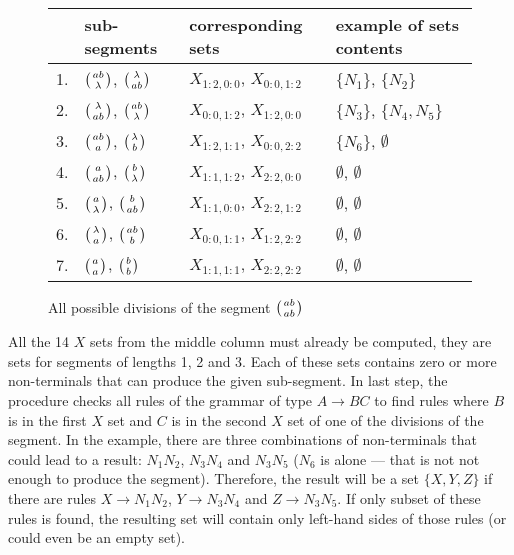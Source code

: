 \begin{figure}[H]
  \caption{All possible divisions of the segment $\wkpair{ab}{ab}$}
  \centering
  \label{tab:segment_divisions}
\begin{tabular}{ |l|l|l|l|  }
  \hline
   & sub-segments & corresponding sets  & example of sets contents \\
  \hline
  1. & $\wkpair{ab}{\lambda}$, $\wkpair{\lambda}{ab}$ & $X_{1:2,0:0}$, $X_{0:0,1:2}$ & $\{N_1\}$, $\{N_2\}$ \\ [1ex]
  2. & $\wkpair{\lambda}{ab}$, $\wkpair{ab}{\lambda}$ & $X_{0:0,1:2}$, $X_{1:2,0:0}$ & $\{N_3\}$, $\{N_4, N_5\}$ \\ [1ex]
  3. & $\wkpair{ab}{a}$, $\wkpair{\lambda}{b}$ & $X_{1:2,1:1}$, $X_{0:0,2:2}$ & $\{N_6\}$, $\emptyset$ \\ [1ex]
  4. & $\wkpair{a}{ab}$, $\wkpair{b}{\lambda}$ & $X_{1:1,1:2}$, $X_{2:2,0:0}$ & $\emptyset$, $\emptyset$ \\ [1ex]
  5. & $\wkpair{a}{\lambda}$, $\wkpair{b}{ab}$ & $X_{1:1,0:0}$, $X_{2:2,1:2}$ & $\emptyset$, $\emptyset$ \\ [1ex]
  6. & $\wkpair{\lambda}{a}$, $\wkpair{ab}{b}$ & $X_{0:0,1:1}$, $X_{1:2,2:2}$ & $\emptyset$, $\emptyset$ \\ [1ex]
  7. & $\wkpair{a}{a}$, $\wkpair{b}{b}$ & $X_{1:1,1:1}$, $X_{2:2,2:2}$ & $\emptyset$, $\emptyset$ \\ [1ex]
  \hline
\end{tabular}
\end{figure}


All the 14 $X$ sets from the middle column must already be computed, they are sets for segments of lengths 1, 2 and 3. Each of these sets contains zero or more non-terminals that can produce the given sub-segment. In last step, the procedure checks all rules of the grammar of type $A \rightarrow BC$ to find rules where $B$ is in the first $X$ set and $C$ is in the second $X$ set of one of the divisions of the segment. In the example, there are three combinations of non-terminals that could lead to a result: $N_1N_2$, $N_3N_4$ and $N_3N_5$ ($N_6$ is alone --- that is not not enough to produce the segment). Therefore, the result will be a set $\{X, Y, Z\}$ if there are rules $X \rightarrow N_1N_2$, $Y \rightarrow N_3N_4$ and $Z \rightarrow N_3N_5$. If only subset of these rules is found, the resulting set will contain only left-hand sides of those rules (or could even be an empty set).



